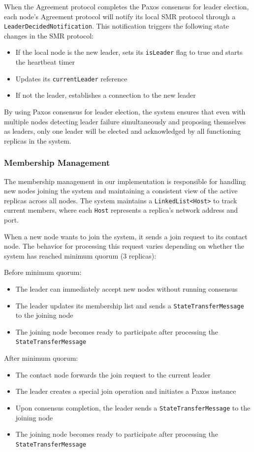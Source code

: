\documentclass[10pt,a4paper,twocolumn]{article}
\begin{document}
When the Agreement protocol completes the Paxos consensus for leader election, each node's Agreement protocol will notify its local SMR protocol through a \texttt{LeaderDecidedNotification}. This notification triggers the following state changes in the SMR protocol:

\begin{itemize}
  	\setlength\itemsep{0em}
	\item If the local node is the new leader, sets its \texttt{isLeader} flag to true and starts the heartbeat timer
	\item Updates its \texttt{currentLeader} reference
	\item If not the leader, establishes a connection to the new leader
\end{itemize}

By using Paxos consensus for leader election, the system ensures that even with multiple nodes detecting leader failure simultaneously and proposing themselves as leaders, only one leader will be elected and acknowledged by all functioning replicas in the system.

\subsubsection{Membership Management}
The membership management in our implementation is responsible for handling new nodes joining the system and maintaining a consistent view of the active replicas across all nodes. The system maintains a \texttt{LinkedList<Host>} to track current members, where each \texttt{Host} represents a replica's network address and port.

When a new node wants to join the system, it sends a join request to its contact node. The behavior for processing this request varies depending on whether the system has reached minimum quorum (3 replicas):

Before minimum quorum:
\begin{itemize}
  	\setlength\itemsep{0em}
	\item The leader can immediately accept new nodes without running consensus
	\item The leader updates its membership list and sends a \texttt{StateTransferMessage} to the joining node
	\item The joining node becomes ready to participate after processing the \texttt{StateTransferMessage}
\end{itemize}

After minimum quorum:
\begin{itemize}
  	\setlength\itemsep{0em}
	\item The contact node forwards the join request to the current leader
	\item The leader creates a special join operation and initiates a Paxos instance
	\item Upon consensus completion, the leader sends a \texttt{StateTransferMessage} to the joining node
	\item The joining node becomes ready to participate after processing the \texttt{StateTransferMessage}
\end{itemize}
\end{document}
